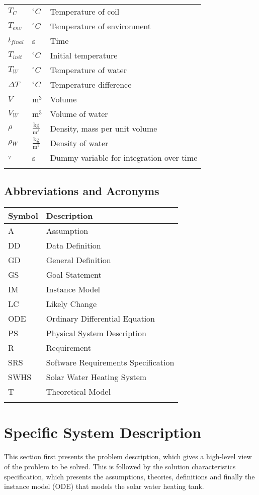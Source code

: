 \documentclass[12pt]{article}
\begin{document}
\begin{longtable*}{l l l}
\\
$T_{C}$ & ${}^{\circ}C$ & Temperature of coil
\\
$T_{env}$ & ${}^{\circ}C$ & Temperature of environment
\\
$t_{final}$ & s & Time
\\
$T_{init}$ & ${}^{\circ}C$ & Initial temperature
\\
$T_{W}$ & ${}^{\circ}C$ & Temperature of water
\\
$\Delta{}T$ & ${}^{\circ}C$ & Temperature difference
\\
$V$ & $\text{m}^{3}$ & Volume
\\
$V_{W}$ & $\text{m}^{3}$ & Volume of water
\\
$\rho{}$ & $\frac{\text{kg}}{\text{m}^{3}}$ & Density, mass per unit volume
\\
$\rho{}_{W}$ & $\frac{\text{kg}}{\text{m}^{3}}$ & Density of water
\\
$\tau{}$ & s & Dummy variable for integration over time
\\
\bottomrule
\label{Table:ToS}
\end{longtable*}
\subsection{Abbreviations and Acronyms}
\label{Sec:AaA}
\begin{longtable*}{l l}
\toprule
Symbol & Description
\\
\midrule
A & Assumption
\\
DD & Data Definition
\\
GD & General Definition
\\
GS & Goal Statement
\\
IM & Instance Model
\\
LC & Likely Change
\\
ODE & Ordinary Differential Equation
\\
PS & Physical System Description
\\
R & Requirement
\\
SRS & Software Requirements Specification
\\
SWHS & Solar Water Heating System
\\
T & Theoretical Model
\\
\bottomrule
\label{Table:AaA}
\end{longtable*}
\section{Specific System Description}
\label{Sec:SSD}
This section first presents the problem description, which gives a high-level view of the problem to be solved. This is followed by the solution characteristics specification, which presents the assumptions, theories, definitions and finally the instance model (ODE) that models the solar water heating tank.
\end{document}
